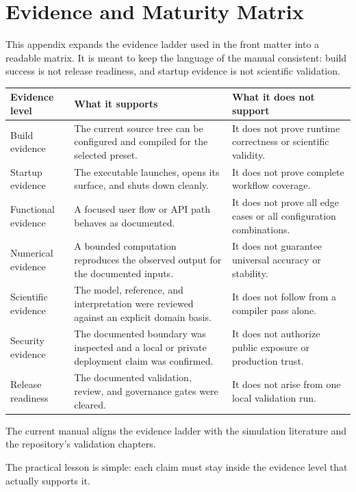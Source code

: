 \chapter{Evidence and Maturity Matrix}
\label{chap:appendix-evidence-and-maturity-matrix}

This appendix expands the evidence ladder used in the front matter into a
readable matrix. It is meant to keep the language of the manual consistent:
build success is not release readiness, and startup evidence is not scientific
validation. 

\begin{table}[htbp]
\centering
\small
\begin{tabular}{|p{2.8cm}|p{5.1cm}|p{4.0cm}|}
\hline
\textbf{Evidence level} & \textbf{What it supports} & \textbf{What it does not support} \\
\hline
Build evidence & The current source tree can be configured and compiled for the selected preset. & It does not prove runtime correctness or scientific validity. \\
\hline
Startup evidence & The executable launches, opens its surface, and shuts down cleanly. & It does not prove complete workflow coverage. \\
\hline
Functional evidence & A focused user flow or API path behaves as documented. & It does not prove all edge cases or all configuration combinations. \\
\hline
Numerical evidence & A bounded computation reproduces the observed output for the documented inputs. & It does not guarantee universal accuracy or stability. \\
\hline
Scientific evidence & The model, reference, and interpretation were reviewed against an explicit domain basis. & It does not follow from a compiler pass alone. \\
\hline
Security evidence & The documented boundary was inspected and a local or private deployment claim was confirmed. & It does not authorize public exposure or production trust. \\
\hline
Release readiness & The documented validation, review, and governance gates were cleared. & It does not arise from one local validation run. \\
\hline
\end{tabular}
\end{table}

The current manual aligns the evidence ladder with the simulation literature
and the repository's validation chapters. \cite{banks2005,law2015,myers2011,sommerville2015}

The practical lesson is simple: each claim must stay inside the evidence level
that actually supports it.
